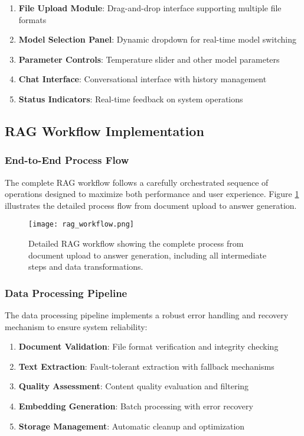 \begin{enumerate}
    \item \textbf{File Upload Module}: Drag-and-drop interface supporting multiple file formats
    \item \textbf{Model Selection Panel}: Dynamic dropdown for real-time model switching
    \item \textbf{Parameter Controls}: Temperature slider and other model parameters
    \item \textbf{Chat Interface}: Conversational interface with history management
    \item \textbf{Status Indicators}: Real-time feedback on system operations
\end{enumerate}

\subsection{RAG Workflow Implementation}

\subsubsection{End-to-End Process Flow}

The complete RAG workflow follows a carefully orchestrated sequence of operations designed to maximize both performance and user experience. Figure \ref{fig:rag_workflow} illustrates the detailed process flow from document upload to answer generation.

\begin{figure}[H]
    \centering
    \texttt{[image: rag\_workflow.png]}
    \caption{Detailed RAG workflow showing the complete process from document upload to answer generation, including all intermediate steps and data transformations.}
    \label{fig:rag_workflow}
\end{figure}

\subsubsection{Data Processing Pipeline}

The data processing pipeline implements a robust error handling and recovery mechanism to ensure system reliability:

\begin{enumerate}
    \item \textbf{Document Validation}: File format verification and integrity checking
    \item \textbf{Text Extraction}: Fault-tolerant extraction with fallback mechanisms
    \item \textbf{Quality Assessment}: Content quality evaluation and filtering
    \item \textbf{Embedding Generation}: Batch processing with error recovery
    \item \textbf{Storage Management}: Automatic cleanup and optimization
\end{enumerate}

